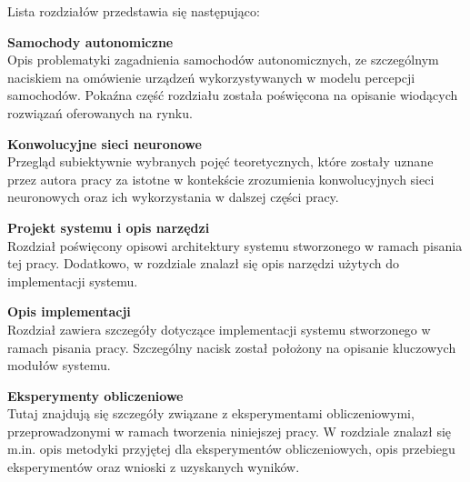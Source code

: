 Lista rozdziałów przedstawia się następująco:
\begin{enumerate*}
\item \textbf{Samochody autonomiczne} \\
Opis problematyki zagadnienia samochodów autonomicznych, ze szczególnym naciskiem na omówienie urządzeń wykorzystywanych w modelu percepcji samochodów. Pokaźna część rozdziału została poświęcona na opisanie wiodących rozwiązań oferowanych na rynku.
\item \textbf{Konwolucyjne sieci neuronowe} \\
Przegląd subiektywnie wybranych pojęć teoretycznych, które zostały uznane przez autora pracy za istotne w kontekście zrozumienia konwolucyjnych sieci neuronowych oraz ich wykorzystania w dalszej części pracy.
\item \textbf{Projekt systemu i opis narzędzi} \\
Rozdział poświęcony opisowi architektury systemu stworzonego w ramach pisania tej pracy. Dodatkowo, w rozdziale znalazł się opis narzędzi użytych do implementacji systemu.
\item \textbf{Opis implementacji} \\
Rozdział zawiera szczegóły dotyczące implementacji systemu stworzonego w ramach pisania pracy. Szczególny nacisk został położony na opisanie kluczowych modułów systemu.
\item \textbf{Eksperymenty obliczeniowe} \\
Tutaj znajdują się szczegóły związane z eksperymentami obliczeniowymi, przeprowadzonymi w ramach tworzenia niniejszej pracy. W rozdziale znalazł się m.in. opis metodyki przyjętej dla eksperymentów obliczeniowych, opis przebiegu eksperymentów oraz wnioski z uzyskanych wyników.
\end{enumerate*}